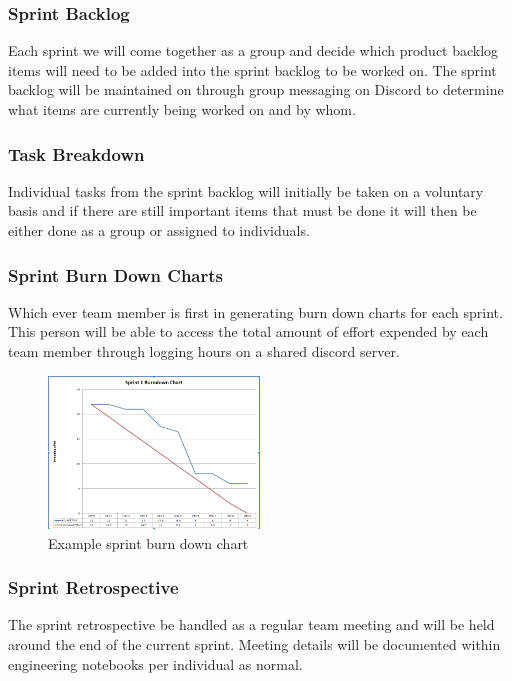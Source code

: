 \subsubsection{Sprint Backlog}
Each sprint we will come together as a group and decide which product backlog items will need to be added into the sprint backlog to be worked on. The sprint backlog will be maintained on through group messaging on Discord to determine what items are currently being worked on and by whom.

\subsubsection{Task Breakdown}
Individual tasks from the sprint backlog will initially be taken on a voluntary basis and if there are still important items that must be done it will then be either done as a group or assigned to individuals.

\subsubsection{Sprint Burn Down Charts}
Which ever team member is first in generating burn down charts for each sprint. This person will be able to access the total amount of effort expended by each team member through logging hours on a shared discord server.

\begin{figure}[h!]
    \centering
    \includegraphics[width=0.5\textwidth]{images/sprint1_burndown.png}
    \caption{Example sprint burn down chart}
\end{figure}

\subsubsection{Sprint Retrospective}
The sprint retrospective be handled as a regular team meeting and will be held around the end of the current sprint. Meeting details will be documented within engineering notebooks per individual as normal.

